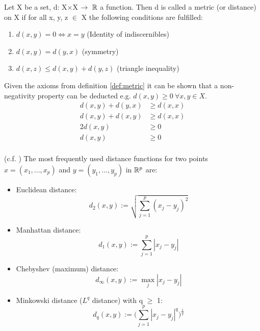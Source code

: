 \begin{definition}\label{def:metric} Let X be a set, d: X$\times$X $\rightarrow~\mathbb{R}$ a function. Then d is called a metric (or distance) on X if for all x, y, z $\in$ X the following conditions are fulfilled: 
\begin{enumerate}[label=(\subscript{D}{\arabic*})]
	\item\label{itm:namee} $d(x,y) = 0 \Leftrightarrow x = y$ \hfill (Identity of indiscernibles)
	\item $d(x,y) = d(y,x)$  \hfill (symmetry)
	\item $d(x,z) \leq d(x,y) + d(y,z)$ \hfill (triangle inequality)
\end{enumerate}

\begin{remark}
	Given the axioms from definition \ref{def:metric} it can be shown that a non-negativity property can be deducted e.g. $d(x,y) \geq 0 ~\forall x,y \in X$.
	\begin{equation*}
	\begin{split}
		d(x,y) + d(y,x) & \geq d(x,x) \\
		d(x,y) + d(x,y) & \geq d(x,x) \\
		2d(x,y)         & \geq 0      \\
		d(x,y)          & \geq 0      \\
	\end{split}
	\end{equation*}
\end{remark}


\begin{example}(c.f. \cite{analysis_1}) The most frequently used distance functions for two points $x=(x_1, ..., x_p)$ and  $y=(y_1, ..., y_p)$ in $\mathbb{R}^p$ are: 
	\begin{itemize}[label=$\star$]
		\item Euclidean distance:
			\begin{equation*}
				d_2(x,y) := \sqrt{\sum_{j=1}^p(x_j - y_j)^2}
			\end{equation*}
		\item Manhattan distance:
			\begin{equation*}
				d_1(x,y) := \sum_{j=1}^p|x_j - y_j|
			\end{equation*}
		\item Chebyshev (maximum) distance:
			\begin{equation*}
				d_\infty(x,y) := \max_j|x_j - y_j|
			\end{equation*}		
		\item Minkowski distance ($L^q$ distance) with q $\geq$ 1:
			\begin{equation*}
				d_q(x,y) := \bigg(\sum_{j=1}^p|x_j - y_j|^q\bigg)^{\frac{1}{q}}
			\end{equation*}	
	\end{itemize}
\end{example}

\end{definition}
